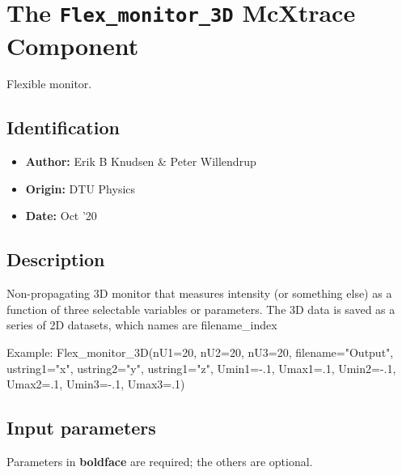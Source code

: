 \section{The \texttt{Flex\_monitor\_3D} McXtrace Component}
Flexible monitor.

\subsection*{Identification}
\begin{itemize}
  \item \textbf{Author:} Erik B Knudsen \& Peter Willendrup
  \item \textbf{Origin:} DTU Physics
  \item \textbf{Date:} Oct '20
\end{itemize}

\subsection*{Description}
Non-propagating 3D monitor that measures intensity (or something else) as a function of three selectable variables or parameters. The 3D data is saved as a series of 2D datasets, which names are filename\_index

Example: Flex\_monitor\_3D(nU1=20, nU2=20, nU3=20, filename="Output", ustring1="x", ustring2="y", ustring1="z", Umin1=-.1, Umax1=.1, Umin2=-.1, Umax2=.1, Umin3=-.1, Umax3=.1)

\subsection*{Input parameters}
Parameters in \textbf{boldface} are required; the others are optional.

